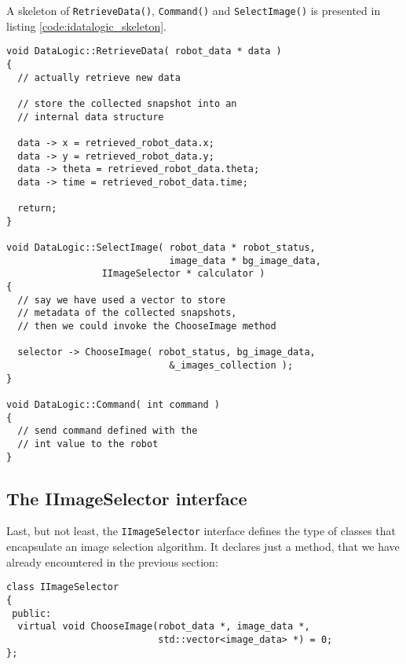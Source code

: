 A skeleton of \texttt{RetrieveData()}, \texttt{Command()} and 
\texttt{SelectImage()} is presented in listing 
\ref{code:idatalogic_skeleton}.
\\
\begin{lstlisting}[caption={\texttt{IDataLogic} methods skeleton},
    label={code:idatalogic_skeleton}]
void DataLogic::RetrieveData( robot_data * data )
{
  // actually retrieve new data

  // store the collected snapshot into an
  // internal data structure
  
  data -> x = retrieved_robot_data.x;
  data -> y = retrieved_robot_data.y;
  data -> theta = retrieved_robot_data.theta; 
  data -> time = retrieved_robot_data.time;

  return;
}

void DataLogic::SelectImage( robot_data * robot_status, 
                             image_data * bg_image_data,
			     IImageSelector * calculator )
{
  // say we have used a vector to store 
  // metadata of the collected snapshots, 
  // then we could invoke the ChooseImage method

  selector -> ChooseImage( robot_status, bg_image_data, 
                             &_images_collection );
}

void DataLogic::Command( int command )
{
  // send command defined with the
  // int value to the robot
}

\end{lstlisting}


\subsection{The IImageSelector interface}
\label{rear:interfaces:iimageselector}

Last, but not least, the \texttt{IImageSelector} interface
defines the type of classes that encapsulate an image 
selection algorithm. It declares just a method, that 
we have already encountered in the previous section:
\\
\begin{lstlisting}[caption={\texttt{IImageSelector} declaration}, 
    label={code:iimageselector}]
class IImageSelector
{
 public:
  virtual void ChooseImage(robot_data *, image_data *, 
                           std::vector<image_data> *) = 0;
};
\end{lstlisting}


